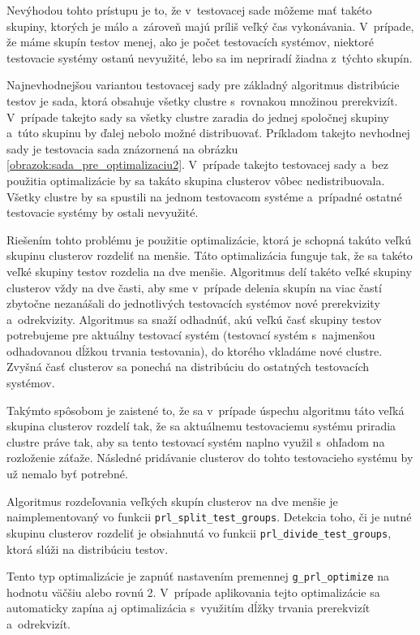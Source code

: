 Nevýhodou tohto prístupu je to, že v~testovacej sade môžeme mať takéto 
skupiny, ktorých je málo a~zároveň majú príliš veľký čas vykonávania. 
V~prípade, že máme skupín testov menej, ako je počet testovacích systémov, 
niektoré testovacie systémy ostanú nevyužité, lebo sa im nepriradí 
žiadna z~týchto skupín.

Najnevhodnejšou variantou testovacej sady pre základný algoritmus 
distribúcie testov je sada, ktorá obsahuje všetky clustre s~rovnakou 
množinou prerekvizít. V~prípade takejto sady sa všetky clustre zaradia 
do jednej spoločnej skupiny a~túto skupinu by ďalej nebolo možné 
distribuovať. Príkladom takejto nevhodnej sady je testovacia sada 
znázornená na obrázku \ref{obrazok:sada_pre_optimalizaciu2}.
V~prípade takejto testovacej sady a~bez použitia optimalizácie by 
sa takáto skupina clusterov vôbec nedistribuovala. Všetky clustre by sa 
spustili na jednom testovacom systéme a~prípadné ostatné testovacie 
systémy by ostali nevyužité.

Riešením tohto problému je použitie optimalizácie, ktorá je schopná 
takúto veľkú skupinu clusterov rozdeliť na menšie. 
Táto optimalizácia funguje tak,
že sa takéto veľké skupiny testov rozdelia na dve menšie. 
Algoritmus delí takéto veľké skupiny clusterov vždy na dve časti, 
aby sme v~prípade delenia skupín na viac častí zbytočne nezanášali do 
jednotlivých testovacích systémov nové prerekvizity a~odrekvizity. 
Algoritmus sa snaží odhadnúť, akú veľkú časť skupiny testov 
potrebujeme pre aktuálny testovací systém 
(testovací systém s~najmenšou odhadovanou dĺžkou trvania testovania), 
do ktorého vkladáme nové clustre. Zvyšná časť clusterov sa ponechá na 
distribúciu do ostatných testovacích systémov. 

Takýmto spôsobom je zaistené to, že sa v~prípade úspechu algoritmu táto 
veľká skupina clusterov rozdelí tak, že sa aktuálnemu testovaciemu 
systému priradia clustre práve tak, aby sa tento testovací systém 
naplno využil s~ohľadom na rozloženie záťaže. Následné pridávanie 
clusterov do tohto testovacieho systému by už nemalo byť potrebné.

Algoritmus rozdeľovania veľkých skupín clusterov na dve menšie je 
naimplementovaný vo funkcii \texttt{prl\_split\_test\_groups}.
Detekcia toho, či je nutné skupinu clusterov rozdeliť je obsiahnutá vo 
funkcii \texttt{prl\_divide\_test\_groups}, ktorá slúži na 
distribúciu testov.

Tento typ optimalizácie je zapnúť nastavením premennej 
\texttt{g\_prl\_optimize} na hodnotu väčšiu alebo rovnú 2. 
V~prípade aplikovania tejto optimalizácie sa automaticky zapína
aj optimalizácia s~využitím dĺžky trvania prerekvizít a~odrekvizít.


